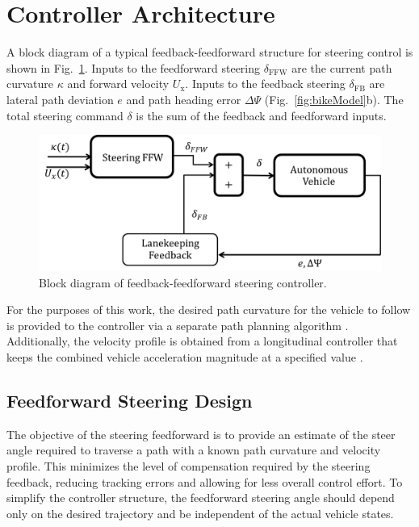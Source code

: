 \documentclass{nVSD2e}
\theoremstyle{plain}
\theoremstyle{definition}
\theoremstyle{remark}
\begin{document}
\section{Controller Architecture}
\label{sec:controller}

A block diagram of a typical feedback-feedforward structure for steering control is shown in Fig.~\ref{fig:controllerBD}. Inputs to the feedforward
steering $\delta_\mathrm{FFW}$ are the current path curvature $\kappa$ and forward velocity $U_\mathrm{x}$. Inputs to the feedback steering $\delta_\mathrm{FB}$ are lateral path deviation
$e$ and path heading error $\Delta\Psi$ (Fig.~\ref{fig:bikeModel}b). The total steering command $\delta$ is the sum of the feedback and feedforward inputs.

\begin{figure}[h]
\centering
\includegraphics[width=.75\columnwidth]{figures/FB_FFW.png}
\caption{Block diagram of feedback-feedforward steering controller.}
\label{fig:controllerBD}
\end{figure}

For the purposes of this work, the desired path curvature for the vehicle to follow is provided to the controller via a separate path planning algorithm \cite{theodosis}. 
Additionally, the velocity profile is obtained from a longitudinal controller that keeps the combined vehicle acceleration 
magnitude at a specified value \cite{mickcop}.

\subsection{Feedforward Steering Design}
\label{sec:baselineFFW}

The objective of the steering feedforward is to provide an estimate of the steer angle required to traverse a path with a known path curvature and velocity profile.
This minimizes the level of compensation required by the steering feedback, reducing tracking errors and allowing for less overall control effort. 
To simplify the controller structure, the feedforward steering angle should depend only on the desired trajectory and be independent of the actual vehicle states.
\end{document}
